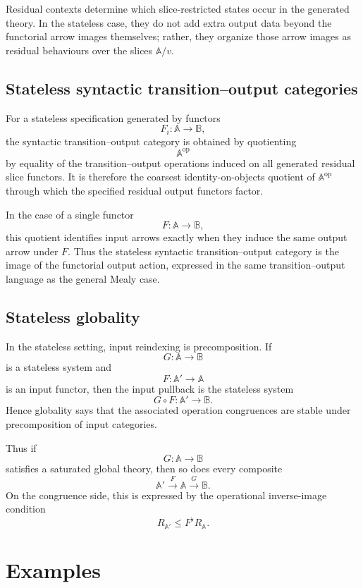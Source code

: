 Residual contexts determine which slice-restricted states occur in the
generated theory. In the stateless case, they do not add extra output data
beyond the functorial arrow images themselves; rather, they organize those
arrow images as residual behaviours over the slices \(\mathbb A/v\).

\subsection{Stateless syntactic transition--output categories}
\label{subsec:to-stateless-syntactic-categories}

For a stateless specification generated by functors
\[
    F_i:\mathbb A\to\mathbb B,
\]
the syntactic transition--output category is obtained by quotienting
\[
    \mathbb A^{\mathrm{op}}
\]
by equality of the transition--output operations induced on all generated
residual slice functors. It is therefore the coarsest identity-on-objects
quotient of \(\mathbb A^{\mathrm{op}}\) through which the specified residual
output functors factor.

In the case of a single functor
\[
    F:\mathbb A\to\mathbb B,
\]
this quotient identifies input arrows exactly when they induce the same output
arrow under \(F\). Thus the stateless syntactic transition--output category is
the image of the functorial output action, expressed in the same
transition--output language as the general Mealy case.

\subsection{Stateless globality}
\label{subsec:to-stateless-globality}

In the stateless setting, input reindexing is precomposition. If
\[
    G:\mathbb A\to\mathbb B
\]
is a stateless system and
\[
    F:\mathbb A'\to\mathbb A
\]
is an input functor, then the input pullback is the stateless system
\[
    G\circ F:\mathbb A'\to\mathbb B.
\]
Hence globality says that the associated operation congruences are stable under
precomposition of input categories.

Thus if
\[
    G:\mathbb A\to\mathbb B
\]
satisfies a saturated global theory, then so does every composite
\[
    \mathbb A'\xrightarrow{F}\mathbb A\xrightarrow{G}\mathbb B.
\]
On the congruence side, this is expressed by the operational inverse-image
condition
\[
    R_{\mathbb A'}\leq F^\flat R_{\mathbb A}.
\]

\section{Examples}
\label{sec:to-examples}

